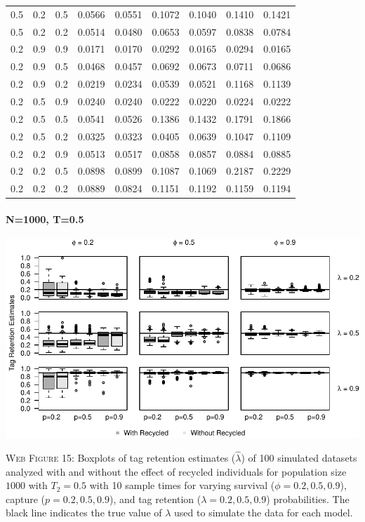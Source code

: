 \documentclass[]{article}
\let\oldparagraph\paragraph
\renewcommand{\paragraph}[1]{\oldparagraph{#1}\mbox{}}
\begin{document}
\begin{table}[ht]
{\begin{tabular}{rrrrrrrrr}
  0.5 & 0.2 & 0.5 & 0.0566 & 0.0551 & 0.1072 & 0.1040 & 0.1410 & 0.1421 \\ 
  0.5 & 0.2 & 0.2 & 0.0514 & 0.0480 & 0.0653 & 0.0597 & 0.0838 & 0.0784 \\ 
  0.2 & 0.9 & 0.9 & 0.0171 & 0.0170 & 0.0292 & 0.0165 & 0.0294 & 0.0165 \\ 
  0.2 & 0.9 & 0.5 & 0.0468 & 0.0457 & 0.0692 & 0.0673 & 0.0711 & 0.0686 \\ 
  0.2 & 0.9 & 0.2 & 0.0219 & 0.0234 & 0.0539 & 0.0521 & 0.1168 & 0.1139 \\ 
  0.2 & 0.5 & 0.9 & 0.0240 & 0.0240 & 0.0222 & 0.0220 & 0.0224 & 0.0222 \\ 
  0.2 & 0.5 & 0.5 & 0.0541 & 0.0526 & 0.1386 & 0.1432 & 0.1791 & 0.1866 \\ 
  0.2 & 0.5 & 0.2 & 0.0325 & 0.0323 & 0.0405 & 0.0639 & 0.1047 & 0.1109 \\ 
  0.2 & 0.2 & 0.9 & 0.0513 & 0.0517 & 0.0858 & 0.0857 & 0.0884 & 0.0885 \\ 
  0.2 & 0.2 & 0.5 & 0.0898 & 0.0899 & 0.1087 & 0.1069 & 0.2187 & 0.2229 \\ 
  0.2 & 0.2 & 0.2 & 0.0889 & 0.0824 & 0.1151 & 0.1192 & 0.1159 & 0.1194 \\ 
   \hline
\end{tabular}
}
\endgroup
\end{table}

\newpage

\paragraph{N=1000, T=0.5}\label{n1000-t0.5-2}

\includegraphics{Appendix_BW_files/figure-latex/figure15_tagretention_GJSTL4-1.pdf}

\textsc{Web Figure 15:} Boxplots of tag retention estimates
(\(\hat{\lambda}\)) of 100 simulated datasets analyzed with and without
the effect of recycled individuals for population size \(1000\) with
\(T_2=0.5\) with 10 sample times for varying survival
(\(\phi=0.2,0.5,0.9\)), capture (\(p=0.2,0.5,0.9\)), and tag retention
(\(\lambda=0.2,0.5,0.9\)) probabilities. The black line indicates the
true value of \(\lambda\) used to simulate the data for each model.
\end{document}
